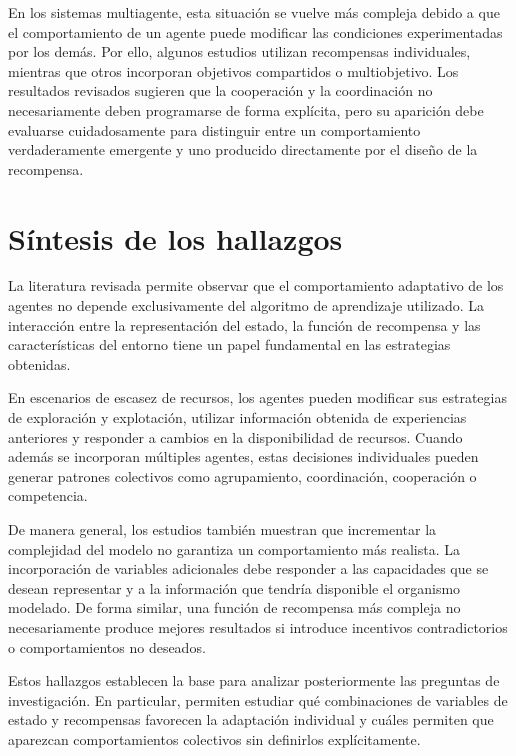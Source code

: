 \documentclass[conference]{IEEEtran}
\begin{document}
En los sistemas multiagente, esta situación se vuelve más compleja debido
a que el comportamiento de un agente puede modificar las condiciones
experimentadas por los demás. Por ello, algunos estudios utilizan
recompensas individuales, mientras que otros incorporan objetivos
compartidos o multiobjetivo. Los resultados revisados sugieren que la
cooperación y la coordinación no necesariamente deben programarse de
forma explícita, pero su aparición debe evaluarse cuidadosamente para
distinguir entre un comportamiento verdaderamente emergente y uno
producido directamente por el diseño de la recompensa.

\section{Síntesis de los hallazgos}

La literatura revisada permite observar que el comportamiento adaptativo
de los agentes no depende exclusivamente del algoritmo de aprendizaje
utilizado. La interacción entre la representación del estado, la función
de recompensa y las características del entorno tiene un papel
fundamental en las estrategias obtenidas.

En escenarios de escasez de recursos, los agentes pueden modificar sus
estrategias de exploración y explotación, utilizar información obtenida
de experiencias anteriores y responder a cambios en la disponibilidad de
recursos. Cuando además se incorporan múltiples agentes, estas decisiones
individuales pueden generar patrones colectivos como agrupamiento,
coordinación, cooperación o competencia.

De manera general, los estudios también muestran que incrementar la
complejidad del modelo no garantiza un comportamiento más realista. La
incorporación de variables adicionales debe responder a las capacidades
que se desean representar y a la información que tendría disponible el
organismo modelado. De forma similar, una función de recompensa más
compleja no necesariamente produce mejores resultados si introduce
incentivos contradictorios o comportamientos no deseados.

Estos hallazgos establecen la base para analizar posteriormente las
preguntas de investigación. En particular, permiten estudiar qué
combinaciones de variables de estado y recompensas favorecen la
adaptación individual y cuáles permiten que aparezcan comportamientos
colectivos sin definirlos explícitamente.
\end{document}
